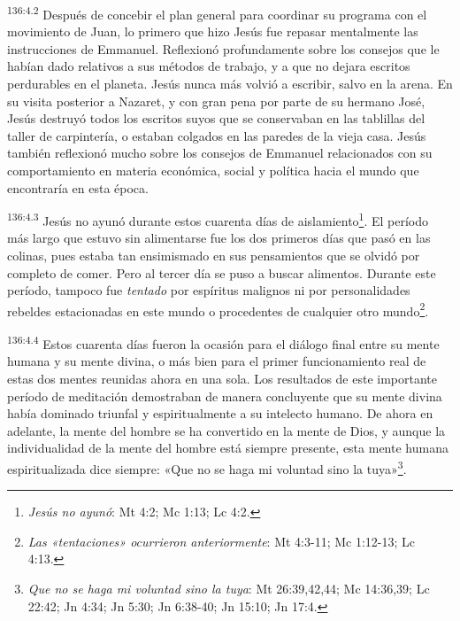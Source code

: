 \par 
\textsuperscript{136:4.2} Después de concebir el plan general para coordinar su programa con el movimiento de Juan, lo primero que hizo Jesús fue repasar mentalmente las instrucciones de Emmanuel. Reflexionó profundamente sobre los consejos que le habían dado relativos a sus métodos de trabajo, y a que no dejara escritos perdurables en el planeta. Jesús nunca más volvió a escribir, salvo en la arena. En su visita posterior a Nazaret, y con gran pena por parte de su hermano José, Jesús destruyó todos los escritos suyos que se conservaban en las tablillas del taller de carpintería, o estaban colgados en las paredes de la vieja casa. Jesús también reflexionó mucho sobre los consejos de Emmanuel relacionados con su comportamiento en materia económica, social y política hacia el mundo que encontraría en esta época.

\par 
\textsuperscript{136:4.3} Jesús no ayunó durante estos cuarenta días de aislamiento\footnote{\textit{Jesús no ayunó}: Mt 4:2; Mc 1:13; Lc 4:2.}. El período más largo que estuvo sin alimentarse fue los dos primeros días que pasó en las colinas, pues estaba tan ensimismado en sus pensamientos que se olvidó por completo de comer. Pero al tercer día se puso a buscar alimentos. Durante este período, tampoco fue \textit{tentado} por espíritus malignos ni por personalidades rebeldes estacionadas en este mundo o procedentes de cualquier otro mundo\footnote{\textit{Las «tentaciones» ocurrieron anteriormente}: Mt 4:3-11; Mc 1:12-13; Lc 4:13.}.

\par 
\textsuperscript{136:4.4} Estos cuarenta días fueron la ocasión para el diálogo final entre su mente humana y su mente divina, o más bien para el primer funcionamiento real de estas dos mentes reunidas ahora en una sola. Los resultados de este importante período de meditación demostraban de manera concluyente que su mente divina había dominado triunfal y espiritualmente a su intelecto humano. De ahora en adelante, la mente del hombre se ha convertido en la mente de Dios, y aunque la individualidad de la mente del hombre está siempre presente, esta mente humana espiritualizada dice siempre: «Que no se haga mi voluntad sino la tuya»\footnote{\textit{Que no se haga mi voluntad sino la tuya}: Mt 26:39,42,44; Mc 14:36,39; Lc 22:42; Jn 4:34; Jn 5:30; Jn 6:38-40; Jn 15:10; Jn 17:4.}.

